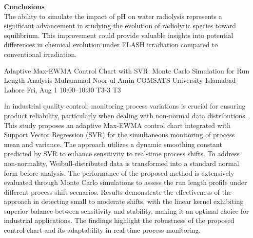 \begin{talk}
\textbf{Conclusions}\\
The ability to simulate the impact of pH on water radiolysis represents a significant advancement in studying the evolution of radiolytic species toward equilibrium. This improvement could provide valuable insights into potential differences in chemical evolution under FLASH irradiation compared to conventional irradiation.


\medskip



\end{talk}

\begin{talk}
  {Adaptive Max-EWMA Control Chart with SVR: Monte Carlo Simulation for Run Length Analysis}%
  {Muhammad Noor ul Amin}%
  {COMSATS University Islamabad-Lahore}%
  {}%
  {}%
  {}%
  {Fri, Aug 1 10:00–10:30}%
  {T3-3}%
  {T3}%
  {}%
  {}%
  {}%
				
			
In industrial quality control, monitoring process variations is crucial for ensuring product
reliability, particularly when dealing with non-normal data distributions. This study proposes an
adaptive Max-EWMA control chart integrated with Support Vector Regression (SVR) for the
simultaneous monitoring of process mean and variance. The approach utilizes a dynamic
smoothing constant predicted by SVR to enhance sensitivity to real-time process shifts. To
address non-normality, Weibull-distributed data is transformed into a standard normal form
before analysis. The performance of the proposed method is extensively evaluated through
Monte Carlo simulations to assess the run length profile under different process shift scenarios.
Results demonstrate the effectiveness of the approach in detecting small to moderate shifts, with
the linear kernel exhibiting superior balance between sensitivity and stability, making it an
optimal choice for industrial applications. The findings highlight the robustness of the proposed
control chart and its adaptability in real-time process monitoring.
\medskip

\end{talk}

